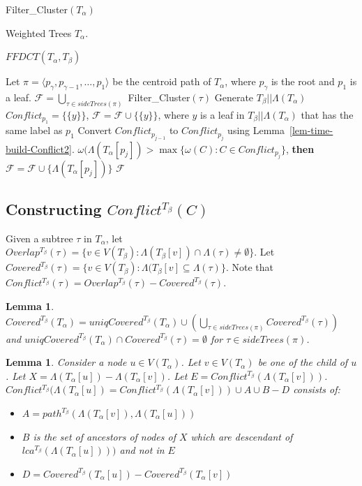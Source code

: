 \documentclass[final,1p,times]{elsarticle}
\newcommand{\weight}{\omega}
\newcommand{\TA}{T_\alpha}
\newcommand{\TB}{T_\beta}
\newtheorem{lemma}[theorem]{Lemma}
\begin{document}
    \begin{algorithm}[!ht]
		\caption{Filter\_Cluster$(\TA)$}
        \label{alg:FFDCT}

        \begin{algorithmic}[1]
		\Input Weighted Trees $\TA$.

		\Output $FFDCT(\TA, \TB)$

            \State Let $\pi = \langle p_{\gamma}, p_{\gamma - 1}, \dots, p_1 \rangle$ be the centroid path of $\TA$, where $p_{\gamma}$ is the root and $p_1$ is a leaf.
            \label{step:centroidpath}
		\State $\mathcal{F} = \bigcup_{\tau \in sideTrees(\pi)}$ Filter\_Cluster$(\tau)$
		\label{step:sideTrees}
		\State Generate $\TB||\Lambda(\TA)$
            \label{step:restriction}
		\State $Conflict_{p_1} = \{ \{y\} \}$, $\mathcal{F}=\mathcal{F} \cup \{ \{y\} \}$, where $y$ is a leaf in $T_{\beta}||\Lambda(\TA)$ that has the same label as $p_1$
		\label{step:conflict_start}
			\State Convert $Conflict_{p_{j-1}}$ to $Conflict_{p_j}$ using Lemma~\ref{lem-time-build-Conflict2}.
			 $\weight(\Lambda(\TA[p_j]) > \max \{ \weight(C) : C \in Conflict_{p_j} \}$, {\bf then} $\mathcal{F} = \mathcal{F} \cup \{ \Lambda(\TA[p_j]) \}$
		\EndFor
		\label{step:conflict_end}
		\State \Return $\mathcal{F}$
        \end{algorithmic}
    \end{algorithm}

    \subsection{Constructing $Conflict^{\TB}(C)$}
    Given a subtree $\tau$ in $T_{\alpha}$, let $Overlap^{\TB}(\tau) = \{ v \in V(T_{\beta}) : \Lambda(T_{\beta}[v]) \cap \Lambda(\tau) \neq \emptyset \}$.
    Let $Covered^{\TB}(\tau) = \{ v \in V(T_{\beta}) : \Lambda(T_{\beta}[v] \subseteq \Lambda(\tau) \}$.
    Note that $Conflict^{\TB}(\tau) = Overlap^{\TB}(\tau) - Covered^{\TB}(\tau)$.
    \begin{lemma}
	$Covered^{\TB}(\TA) = uniqCovered^{\TB}(\TA) \cup \left( \bigcup_{\tau \in sideTrees(\pi)} Covered^{\TB}(\tau) \right)$
	    and $uniqCovered^{\TB}(\TA) \cap Covered^{\TB}(\tau) = \emptyset$ for $\tau \in sideTrees(\pi)$.
    \end{lemma}

    \begin{lemma}
	    \label{lem-build-Conflict1}
	    Consider a node $u \in V(\TA)$. Let $v \in V(\TA)$ be one of the child of $u$. Let $X=\Lambda(\TA[u])-\Lambda(\TA[v])$. Let $E=Conflict^{\TB}(\Lambda(\TA[v]))$.
	    $Conflict^{\TB}(\Lambda(\TA[u]) = Conflict^{\TB}(\Lambda(\TA[v])) \cup A \cup B - D$ consists of:
	\begin{itemize}
		\item $A = path^{T_{\beta}}(\Lambda(\TA[v]), \Lambda(\TA[u]))$
		\item $B$ is the set of ancestors of nodes of $X$ which are descendant of $lca^{T_{\beta}}(\Lambda(\TA[u])))$ and not in $E$
		\item $D = Covered^{\TB}(\TA[u]) - Covered^{\TB}(\TA[v])$
	\end{itemize}
    \end{lemma}
\end{document}
